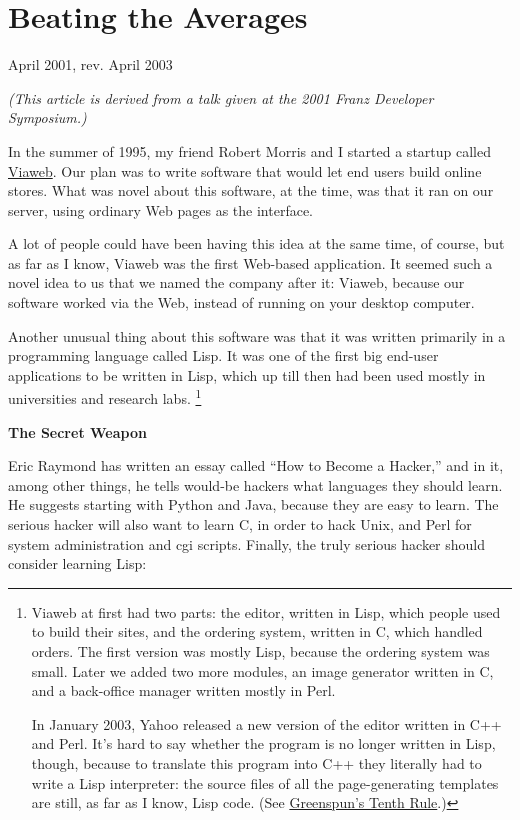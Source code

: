 \chapter{Beating the Averages}

April 2001, rev. April 2003

\emph{(This article is derived from a talk given at the 2001 Franz
Developer Symposium.)}

In the summer of 1995, my friend Robert Morris and I started a startup
called \href{http://docs.yahoo.com/docs/pr/release184.html}{Viaweb}. Our
plan was to write software that would let end users build online stores.
What was novel about this software, at the time, was that it ran on our
server, using ordinary Web pages as the interface.

A lot of people could have been having this idea at the same time, of
course, but as far as I know, Viaweb was the first Web-based
application. It seemed such a novel idea to us that we named the company
after it: Viaweb, because our software worked via the Web, instead of
running on your desktop computer.

Another unusual thing about this software was that it was written
primarily in a programming language called Lisp. It was one of the first
big end-user applications to be written in Lisp, which up till then had
been used mostly in universities and research labs. \footnote{Viaweb at first had two parts: the editor, written in Lisp,
which people used to build their sites, and the ordering system, written
in C, which handled orders. The first version was mostly Lisp, because
the ordering system was small. Later we added two more modules, an image
generator written in C, and a back-office manager written mostly in
Perl.

In January 2003, Yahoo released a new version of the editor written in
C++ and Perl. It's hard to say whether the program is no longer written
in Lisp, though, because to translate this program into C++ they
literally had to write a Lisp interpreter: the source files of all the
page-generating templates are still, as far as I know, Lisp code. (See
\href{quotes.html}{Greenspun's Tenth Rule}.)}

\textbf{The Secret Weapon}

Eric Raymond has written an essay called ``How to Become a Hacker,'' and
in it, among other things, he tells would-be hackers what languages they
should learn. He suggests starting with Python and Java, because they
are easy to learn. The serious hacker will also want to learn C, in
order to hack Unix, and Perl for system administration and cgi scripts.
Finally, the truly serious hacker should consider learning Lisp:


